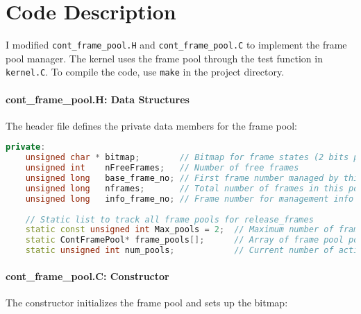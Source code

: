 \documentclass{article}
\begin{document}
\newpage
\section*{Code Description}

I modified \texttt{cont\_frame\_pool.H} and \texttt{cont\_frame\_pool.C} to implement the frame pool manager. The kernel uses the frame pool through the test function in \texttt{kernel.C}. To compile the code, use \texttt{make} in the project directory.

\paragraph{cont\_frame\_pool.H: Data Structures} The header file defines the private data members for the frame pool:

\begin{lstlisting}[language=C++, caption=Frame Pool Data Structures]
private:
    unsigned char * bitmap;        // Bitmap for frame states (2 bits per frame)
    unsigned int    nFreeFrames;   // Number of free frames
    unsigned long   base_frame_no; // First frame number managed by this pool
    unsigned long   nframes;       // Total number of frames in this pool
    unsigned long   info_frame_no; // Frame number for management info (0 = internal)
    
    // Static list to track all frame pools for release_frames
    static const unsigned int Max_pools = 2;  // Maximum number of frame pools (kernel + process)
    static ContFramePool* frame_pools[];      // Array of frame pool pointers
    static unsigned int num_pools;            // Current number of active pools
\end{lstlisting}

\paragraph{cont\_frame\_pool.C: Constructor} The constructor initializes the frame pool and sets up the bitmap:
\end{document}

